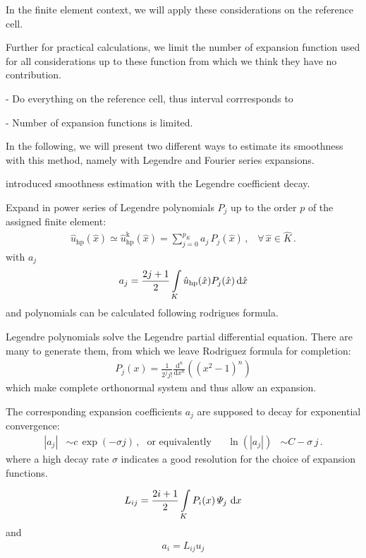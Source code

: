 In the finite element context, we will apply these considerations on the reference cell.


Further for practical calculations, we limit the number of expansion function used for all considerations up to these function from which we think they have no contribution.



- Do everything on the reference cell, thus interval corrresponds to

- Number of expansion functions is limited.


In the following, we will present two different ways to estimate its smoothness with this method, namely with Legendre and Fourier series expansions.

\textcite{mavriplis1994} introduced smoothness estimation with the Legendre coefficient decay.

Expand in power series of Legendre polynomials $P_j$ up to the order $p$ of the assigned finite element:
\begin{align}
\hat{u}_\text{hp} (\hat x) \simeq \hat{u}_\text{hp}^\text{k} (\hat x) = \sum\limits_{j=0}^{p_K} a_j \, P_j(\hat x) \,\text{,} \quad \forall \, \hat{x} \in \hat{K} \,\text{.}
\end{align}
with $a_j$
\begin{align}
a_j = \frac{2j+1}{2} \int\limits_K \hat{u}_\text{hp}(\hat{x}) P_j(\hat{x}) \mathop{}\!\mathrm{d}\hat{x}
\end{align}
and polynomials can be calculated following rodrigues formula.

Legendre polynomials solve the Legendre partial differential equation. There are many to generate them, from which we leave Rodriguez formula for completion:
\begin{align}
P_j(x) = \frac{1}{2^j j!} \frac{\text{d}^n}{\text{d}x^n} \left( \left(x^2 - 1\right)^n \right)
\end{align}
which make complete orthonormal system and thus allow an expansion.


The corresponding expansion coefficients $a_j$ are supposed to decay for exponential convergence:
\begin{align}
|a_j| &\sim c \, \exp(-\sigma j) \,\text{,} &\text{or equivalently}&& \ln\left(|a_j|\right) &\sim C - \sigma \, j \,\text{.}
\end{align}
where a high decay rate $\sigma$ indicates a good resolution for the choice of expansion functions.



\begin{align}
L_{ij} = \frac{2i+1}{2} \int\limits_K P_i(x) \, \Psi_j \, \mathop{}\!\mathrm{d}x
\end{align}
and
\begin{align}
a_i = L_{ij} u_j
\end{align}

